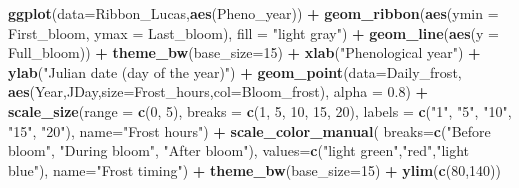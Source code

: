 \documentclass[
]{book}
\newenvironment{Shaded}{\begin{snugshade}}{\end{snugshade}}
\newcommand{\DataTypeTok}[1]{\textcolor[rgb]{0.13,0.29,0.53}{#1}}
\newcommand{\DecValTok}[1]{\textcolor[rgb]{0.00,0.00,0.81}{#1}}
\newcommand{\FloatTok}[1]{\textcolor[rgb]{0.00,0.00,0.81}{#1}}
\newcommand{\KeywordTok}[1]{\textcolor[rgb]{0.13,0.29,0.53}{\textbf{#1}}}
\newcommand{\NormalTok}[1]{#1}
\newcommand{\OperatorTok}[1]{\textcolor[rgb]{0.81,0.36,0.00}{\textbf{#1}}}
\newcommand{\StringTok}[1]{\textcolor[rgb]{0.31,0.60,0.02}{#1}}
\begin{document}
\begin{Shaded}
\begin{Highlighting}[]
\KeywordTok{ggplot}\NormalTok{(}\DataTypeTok{data=}\NormalTok{Ribbon_Lucas,}\KeywordTok{aes}\NormalTok{(Pheno_year)) }\OperatorTok{+}
\StringTok{  }\KeywordTok{geom_ribbon}\NormalTok{(}\KeywordTok{aes}\NormalTok{(}\DataTypeTok{ymin =}\NormalTok{ First_bloom, }\DataTypeTok{ymax =}\NormalTok{ Last_bloom),}
              \DataTypeTok{fill =} \StringTok{"light gray"}\NormalTok{) }\OperatorTok{+}
\StringTok{  }\KeywordTok{geom_line}\NormalTok{(}\KeywordTok{aes}\NormalTok{(}\DataTypeTok{y =}\NormalTok{ Full_bloom)) }\OperatorTok{+}
\StringTok{  }\KeywordTok{theme_bw}\NormalTok{(}\DataTypeTok{base_size=}\DecValTok{15}\NormalTok{) }\OperatorTok{+}
\StringTok{  }\KeywordTok{xlab}\NormalTok{(}\StringTok{"Phenological year"}\NormalTok{) }\OperatorTok{+}
\StringTok{  }\KeywordTok{ylab}\NormalTok{(}\StringTok{"Julian date (day of the year)"}\NormalTok{) }\OperatorTok{+}
\StringTok{  }\KeywordTok{geom_point}\NormalTok{(}\DataTypeTok{data=}\NormalTok{Daily_frost,}
             \KeywordTok{aes}\NormalTok{(Year,JDay,}\DataTypeTok{size=}\NormalTok{Frost_hours,}\DataTypeTok{col=}\NormalTok{Bloom_frost),}
             \DataTypeTok{alpha =} \FloatTok{0.8}\NormalTok{) }\OperatorTok{+}\StringTok{ }
\StringTok{  }\KeywordTok{scale_size}\NormalTok{(}\DataTypeTok{range =} \KeywordTok{c}\NormalTok{(}\DecValTok{0}\NormalTok{, }\DecValTok{5}\NormalTok{),}
             \DataTypeTok{breaks =} \KeywordTok{c}\NormalTok{(}\DecValTok{1}\NormalTok{, }\DecValTok{5}\NormalTok{, }\DecValTok{10}\NormalTok{, }\DecValTok{15}\NormalTok{, }\DecValTok{20}\NormalTok{),}
             \DataTypeTok{labels =} \KeywordTok{c}\NormalTok{(}\StringTok{"1"}\NormalTok{, }\StringTok{"5"}\NormalTok{, }\StringTok{"10"}\NormalTok{, }\StringTok{"15"}\NormalTok{, }\StringTok{"20"}\NormalTok{),}
             \DataTypeTok{name=}\StringTok{"Frost hours"}\NormalTok{) }\OperatorTok{+}
\StringTok{  }\KeywordTok{scale_color_manual}\NormalTok{(}
    \DataTypeTok{breaks=}\KeywordTok{c}\NormalTok{(}\StringTok{"Before bloom"}\NormalTok{, }\StringTok{"During bloom"}\NormalTok{, }\StringTok{"After bloom"}\NormalTok{),}
    \DataTypeTok{values=}\KeywordTok{c}\NormalTok{(}\StringTok{"light green"}\NormalTok{,}\StringTok{"red"}\NormalTok{,}\StringTok{"light blue"}\NormalTok{),}
    \DataTypeTok{name=}\StringTok{"Frost timing"}\NormalTok{) }\OperatorTok{+}
\StringTok{  }\KeywordTok{theme_bw}\NormalTok{(}\DataTypeTok{base_size=}\DecValTok{15}\NormalTok{) }\OperatorTok{+}
\StringTok{  }\KeywordTok{ylim}\NormalTok{(}\KeywordTok{c}\NormalTok{(}\DecValTok{80}\NormalTok{,}\DecValTok{140}\NormalTok{))}
\end{Highlighting}
\end{Shaded}
\end{document}
